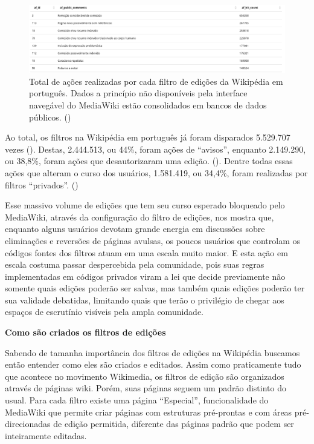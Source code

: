 \begin{figure}[H]
    \centering
    \includegraphics[width=1\textwidth]{Images/mediawiki_bancos_dados_publicos.png}
    \caption{Total de ações realizadas por cada filtro de edições da Wikipédia em português. Dados a princípio não disponíveis pela interface navegável do MediaWiki estão consolidados em bancos de dados públicos.
(\cite{quarry_most_hit_filters})}
    \label{fig:mediawiki_bancos_dados_publicos}
\end{figure}

Ao total, os filtros na Wikipédia em português já foram disparados 5.529.707 vezes (\cite{quarry_filters_count}). Destas, 2.444.513, ou 44\%, foram ações de ``avisos'', enquanto 2.149.290, ou 38,8\%, foram ações que desautorizaram uma edição. (\cite{quarry_warn_disallow_filter_actions}). Dentre todas essas ações que alteram o curso dos usuários, 1.581.419, ou 34,4\%, foram realizadas por filtros ``privados''. (\cite{quarry_warn_disallow_filter_actions_visibility})

Esse massivo volume de edições que tem seu curso esperado bloqueado pelo MediaWiki, através da configuração do filtro de edições, nos mostra que, enquanto alguns usuários devotam grande energia em discussões sobre eliminações e reversões de páginas avulsas, os poucos usuários que controlam os códigos fontes dos filtros atuam em uma escala muito maior. E esta ação em escala costuma passar despercebida pela comunidade, pois suas regras implementadas em códigos privados viram a lei que decide previamente não somente quais edições poderão ser salvas, mas também quais edições poderão ter sua validade debatidas, limitando quais que terão o privilégio de chegar aos espaços de escrutínio visíveis pela ampla comunidade.

\textbf{Como são criados os filtros de edições}

Sabendo de tamanha importância dos filtros de edições na Wikipédia buscamos então entender como eles são criados e editados. Assim como praticamente tudo que acontece no movimento Wikimedia, os filtros de edição são organizados através de páginas wiki. Porém, suas páginas seguem um padrão distinto do usual. Para cada filtro existe uma página ``Especial'', funcionalidade do MediaWiki que permite criar páginas com estruturas pré-prontas e com áreas pré-direcionadas de edição permitida, diferente das páginas padrão que podem ser inteiramente editadas.

